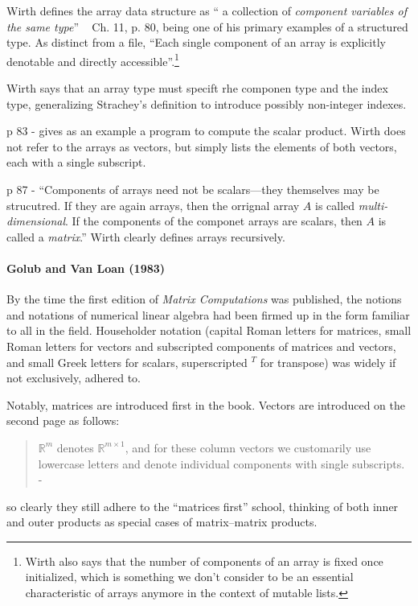 Wirth defines the array data structure as `` a collection of \textit{component variables of the same type}'' ~ Ch. 11, p. 80, being one of his primary examples of a structured type. As distinct from a file, ``Each single component of an array is explicitly denotable and directly accessible''.\footnote{Wirth also says that the number of
components of an array is fixed once initialized, which is something we don't
consider to be an essential characteristic of arrays anymore in the context of
mutable lists.}

Wirth says that an array type must specift rhe componen type and the index type,
generalizing Strachey's definition to introduce possibly non-integer indexes.

p 83 - gives as an example a program to compute the scalar product.
Wirth does not refer to the arrays as vectors, but simply lists the elements of
both vectors, each with a single subscript.

p 87 - ``Components of arrays need not be scalars---they themselves may be strucutred.
If they are again arrays, then the orrignal array $A$ is called \textit{multi-dimensional}.
If the components of the componet arrays are scalars, then
$A$ is called a \textit{matrix}.'' Wirth clearly defines arrays recursively.



\paragraph{Golub and Van Loan (1983)~\cite{Golub1983}}

By the time the first edition of \textit{Matrix Computations} was published,
the notions and notations of numerical linear algebra had been firmed up in the
form familiar to all in the field. Householder notation (capital Roman letters
for matrices, small Roman letters for vectors and subscripted components of matrices and vectors,
and small Greek letters for scalars, superscripted $^T$ for transpose) was widely
if not exclusively, adhered to.

Notably, matrices are introduced first in the book.
Vectors are introduced on the second page as follows:
%
\begin{quote}
$\mathbb R^m$ denotes $\mathbb R^{m\times1}$, and for these column vectors we customarily use
lowercase letters and denote individual components with single subscripts.
- \cite[p. 2]{Golub1983}
\end{quote}
%
so clearly they still adhere to the ``matrices first'' school, thinking of both
inner and outer products as special cases of matrix--matrix products.

